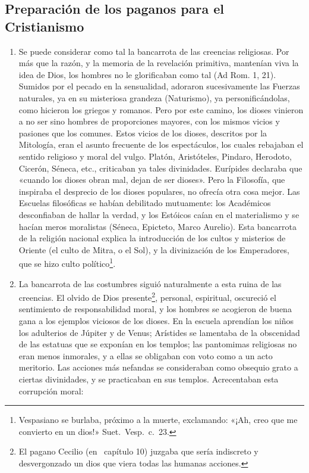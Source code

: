 \raggedbottom{} \documentclass[12pt, a4paper, openany]{book} %
\begin{document}
\subsection{Preparación de los paganos para el Cristianismo}
\begin{enumerate}
  \item Se puede considerar como tal la bancarrota de las creencias religiosas. Por más que la razón, y la memoria de la revelación primitiva, mantenían viva la idea de Dios, los hombres no le glorificaban como tal (Ad Rom. 1, 21). Sumidos por el pecado en la sensualidad, adoraron sucesivamente las Fuerzas naturales, ya en su misteriosa grandeza (Naturismo), ya personificándolas, como hicieron los griegos y romanos. Pero por este camino, los dioses vinieron a no ser sino hombres de proporciones mayores, con los mismos vicios y pasiones que los comunes. Estos vicios de los dioses, descritos por la Mitología, eran el asunto frecuente de los espectáculos, los cuales rebajaban el sentido religioso y moral del vulgo. Platón, Aristóteles, Pindaro, Herodoto, Cicerón, Séneca, etc., criticaban ya tales divinidades. Eurípides declaraba que «cuando los dioses obran mal, dejan de ser dioses». Pero la Filosofía, que inspiraba el desprecio de los dioses populares, no ofrecía otra cosa mejor. Las Escuelas filosóficas se habían debilitado mutuamente: los Académicos desconfiaban de hallar la verdad, y los Estóicos caían en el materialismo y se hacían meros moralistas (Séneca, Epicteto, Marco Aurelio). Esta bancarrota de la religión nacional explica la introducción de los cultos y misterios de Oriente (el culto de Mitra, o el Sol), y la divinización de los Emperadores, que se hizo culto político\textdagger\footnote{Vespasiano se burlaba, próximo a la muerte, exclamando: «¡Ah, creo que me convierto en un dios!» Suet.\ Vesp.\ c.\ 23.}.
  \item La bancarrota de las costumbres siguió naturalmente a esta ruina de las creencias. El olvido de Dios presente\textdagger\footnote{El pagano Cecilio (en~\cite{Cecilio197Minucio} capítulo 10) juzgaba que sería indiscreto y desvergonzado un dios que viera todas las humanas acciones.}, personal, espiritual, oscureció el sentimiento de responsabilidad moral, y los hombres se acogieron de buena gana a los ejemplos viciosos de los dioses. En la escuela aprendían los niños los adulterios de Júpiter y de Venus; Arístides se lamentaba de la obscenidad de las estatuas que se exponían en los templos; las pantomimas religiosas no eran menos inmorales, y a ellas se obligaban con voto como a un acto meritorio. Las acciones más nefandas se consideraban como obsequio grato a ciertas divinidades, y se practicaban en sus templos. Acrecentaban esta corrupción moral: \begin{enumerate}

\end{enumerate}
\end{enumerate}
\end{document}
